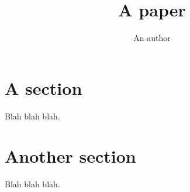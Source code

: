 \documentclass{article}
\title{A paper}
\author{An author}
\begin{document}
\maketitle

\section{A section}

Blah blah blah.

\section{Another section}

Blah blah blah.
\end{document}
